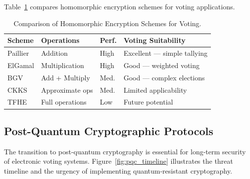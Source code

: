 \documentclass[sigconf,nonacm]{acmart}
\begin{document}
Table~\ref{tab:he_schemes} compares homomorphic encryption schemes for voting
applications.

\begin{table}[h]
\caption{Comparison of Homomorphic Encryption Schemes for Voting.}
\label{tab:he_schemes}
\small
\begin{tabularx}{\columnwidth}{@{}p{1.3cm}p{2.0cm}p{1.1cm}X@{}}
\toprule
\textbf{Scheme} & \textbf{Operations} & \textbf{Perf.} & \textbf{Voting Suitability} \\
\midrule
Paillier  & Addition        & High   & Excellent — simple tallying \\
ElGamal   & Multiplication  & High   & Good — weighted voting \\
BGV       & Add + Multiply  & Med.   & Good — complex elections \\
CKKS      & Approximate ops & Med.   & Limited applicability \\
TFHE      & Full operations & Low    & Future potential \\
\bottomrule
\end{tabularx}
\end{table}

\subsection{Post-Quantum Cryptographic Protocols}

The transition to post-quantum cryptography is essential for long-term security of
electronic voting systems. Figure~\ref{fig:pqc_timeline} illustrates the threat
timeline and the urgency of implementing quantum-resistant cryptography.
\end{document}
